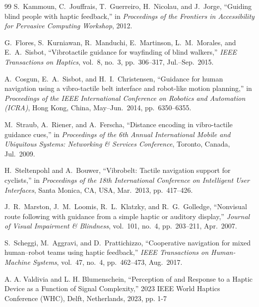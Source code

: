 \documentclass[12pt]{report}
\begin{document}
\begin{thebibliography}{99}
S.~Kammoun, C.~Jouffrais, T.~Guerreiro, H.~Nicolau, and J.~Jorge,
``Guiding blind people with haptic feedback,''
in \textit{Proceedings of the Frontiers in Accessibility for Pervasive Computing Workshop},
2012.

G.~Flores, S.~Kurniawan, R.~Manduchi, E.~Martinson, L.~M.~Morales, and E.~A.~Sisbot,
``Vibrotactile guidance for wayfinding of blind walkers,''
\textit{IEEE Transactions on Haptics},
vol.~8, no.~3, pp.~306--317, Jul.--Sep.\ 2015.

A.~Cosgun, E.~A.~Sisbot, and H.~I.~Christensen,
``Guidance for human navigation using a vibro-tactile belt interface and robot-like
motion planning,''
in \textit{Proceedings of the IEEE International Conference on Robotics and Automation
(ICRA)}, Hong Kong, China, May--Jun.\ 2014, pp.~6350--6355.

M.~Straub, A.~Riener, and A.~Ferscha,
``Distance encoding in vibro-tactile guidance cues,''
in \textit{Proceedings of the 6th Annual International Mobile and Ubiquitous Systems: Networking \& Services Conference},
Toronto, Canada, Jul.\ 2009.

H.~Steltenpohl and A.~Bouwer,
``Vibrobelt: Tactile navigation support for cyclists,''
in \textit{Proceedings of the 18th International Conference on Intelligent User Interfaces},
Santa Monica, CA, USA, Mar.\ 2013, pp.~417--426.

J.~R.~Marston, J.~M.~Loomis, R.~L.~Klatzky, and R.~G.~Golledge,
``Nonvisual route following with guidance from a simple haptic or auditory display,''
\textit{Journal of Visual Impairment \& Blindness},
vol.~101, no.~4, pp.~203--211, Apr.\ 2007.

S.~Scheggi, M.~Aggravi, and D.~Prattichizzo,
``Cooperative navigation for mixed human--robot teams using haptic feedback,''
\textit{IEEE Transactions on Human-Machine Systems},
vol.~47, no.~4, pp.~462--473, Aug.\ 2017.

A. A. Valdivia and L. H. Blumenschein, ``Perception of and Response to a Haptic Device as a Function of Signal Complexity,'' 2023 IEEE World Haptics Conference (WHC), Delft, Netherlands, 2023, pp. 1-7

\end{thebibliography}
\end{document}
